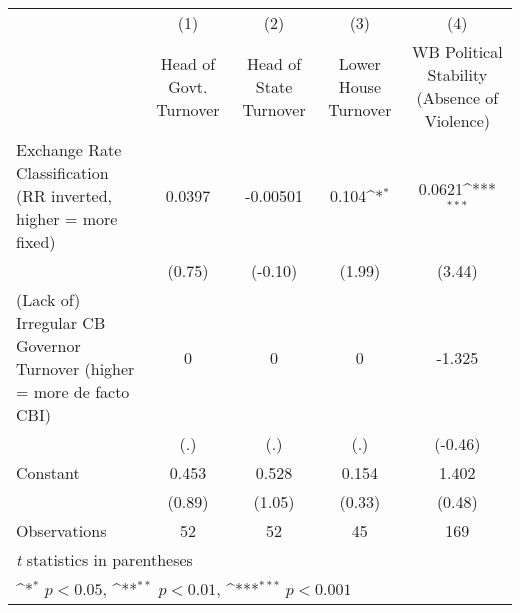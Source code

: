{
\def\sym#1{\ifmmode^{#1}\else\(^{#1}\)\fi}
\begin{tabular*}{\linewidth}{@{\hskip\tabcolsep\extracolsep\fill}l*{4}{c}}
\toprule
                &\multicolumn{1}{c}{(1)}&\multicolumn{1}{c}{(2)}&\multicolumn{1}{c}{(3)}&\multicolumn{1}{c}{(4)}\\
                &\multicolumn{1}{c}{Head of Govt. Turnover}&\multicolumn{1}{c}{Head of State Turnover}&\multicolumn{1}{c}{Lower House Turnover}&\multicolumn{1}{c}{WB Political Stability (Absence of Violence)}\\
\midrule
Exchange Rate Classification (RR inverted, higher = more fixed)&   0.0397         & -0.00501         &    0.104\sym{*}  &   0.0621\sym{***}\\
                &   (0.75)         &  (-0.10)         &   (1.99)         &   (3.44)         \\
\addlinespace
(Lack of) Irregular CB Governor Turnover (higher = more de facto CBI)&        0         &        0         &        0         &   -1.325         \\
                &      (.)         &      (.)         &      (.)         &  (-0.46)         \\
\addlinespace
Constant        &    0.453         &    0.528         &    0.154         &    1.402         \\
                &   (0.89)         &   (1.05)         &   (0.33)         &   (0.48)         \\
\midrule
Observations    &       52         &       52         &       45         &      169         \\
\bottomrule
\multicolumn{5}{l}{\footnotesize \textit{t} statistics in parentheses}\\
\multicolumn{5}{l}{\footnotesize \sym{*} \(p<0.05\), \sym{**} \(p<0.01\), \sym{***} \(p<0.001\)}\\
\end{tabular*}
}
